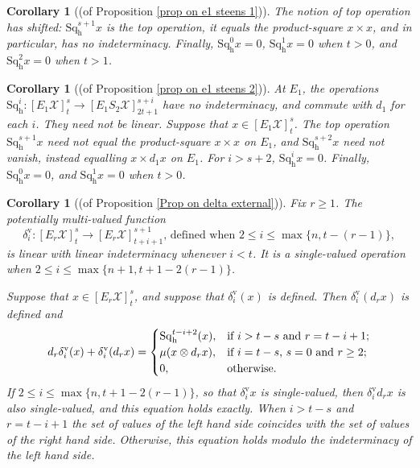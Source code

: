 \documentclass[11pt]{amsart} \renewcommand{\baselinestretch}{1.2}
\theoremstyle{plain}
\newtheorem{cor}[thm]{Corollary}
\numberwithin{equation}{section} %
\theoremstyle{plain}
\newtheorem{cor}[thm]{Corollary}
\numberwithin{equation}{chapter} %
\renewcommand{\to}{\longrightarrow}
\newcommand{\calx}{\mathcal{X}}
\newcommand{\Sq}{\mathrm{Sq}}
\newcommand{\E}[5]{[E^{#1}_{#2}#3]^{#4}_{#5}}
\newcommand{\Edownup}[5]{[E_{#1}^{#2}#3]^{#4}_{#5}}
\newcommand{\uver}{^\mathrm{v}}
\newcommand{\dhor}{_\mathrm{h}}
\newcommand{\Sqh}{\mathrm{Sq}\dhor}
\newcommand{\deltav}{\delta\uver}
\begin{document}
\begin{Operations on the Bousfield-Kan spectral sequence}
\begin{cor}[(of Proposition \ref{prop on e1 steens 1})]
The notion of \emph{top operation} has shifted: $\Sqh^{s+1}x$ is the top operation, it equals the product-square $x\times x$, and in particular,  has no indeterminacy.
Finally, $\Sqh^0x=0$, $\Sqh^{1}x=0$ when $t>0$, and $\Sqh^2x=0$ when $t>1$.
\end{cor}

\begin{cor}[(of Proposition \ref{prop on e1 steens 2})]
\label{prop on e1 steens 2 composed with lift}
At $E_1$, the operations $\Sqh^i:\Edownup{1}{}{\calx}{s}{t}\to \Edownup{1}{}{S_2\calx}{s+i}{2t+1}$ have no indeterminacy, and commute with $d_{1}$ for each $i$. They need not be linear. Suppose that $x\in \Edownup{1}{}{\calx}{s}{t}$.
The top operation $\Sqh^{s+1}x$ need not equal the product-square $x\times x$ on $E_1$, and
$\Sqh^{s+2}x$ need not vanish, instead equalling $x\times d_1x$ on $E_1$.
For $i>s+2$, $\Sqh^ix=0$. Finally, $\Sqh^0x=0$, and $\Sqh^{1}x=0$ when $t>0$.
\end{cor}


\begin{cor}[(of Proposition \ref{Prop on delta external})]
\label{cor on delta external composed with lift}
Fix $r\geq1$. The potentially multi-valued function
\[\deltav_i:\Edownup{r}{}{\calx}{s}{t}\to \Edownup{r}{}{\calx}{s+1}{t+i+1}\text{, defined when }2\leq i\leq \max\{n,t-(r-1)\},\] 
is linear with linear indeterminacy whenever $i<t$. It is a single-valued operation when $2\leq i\leq \max\{n+1,t+1-2(r-1)\}$.


Suppose that $x\in \E{}{r}{\calx}{s}{t}$, and suppose that $\deltav_i ( x)$ is defined. Then $\deltav_i (d_r x)$ is defined and 
\[d_r\deltav_i(x)+ \deltav_i(d_rx)=\begin{cases}
\Sqh^{t-i+2}(x),&\textup{if $i>t-s$ and $r =t-i+1$};\\
\mu(x\otimes d_rx),&\textup{if $i=t-s$,  $s=0$ and $r\geq2$};\\
0,&\textup{otherwise.}
\end{cases}\]
If $2\leq i\leq \max\{n,t+1-2(r-1)\}$, so that $\deltav_i x$ is single-valued, then $\deltav_i d_r x$  is also single-valued, and this equation holds exactly.  When $i>t-s$ and $r =t-i+1$ the set of values of the left hand side coincides with the set of values of the right hand side. Otherwise, this equation holds modulo the indeterminacy of the left hand side. 


\end{cor}
\end{Operations on the Bousfield-Kan spectral sequence}
\end{document}
